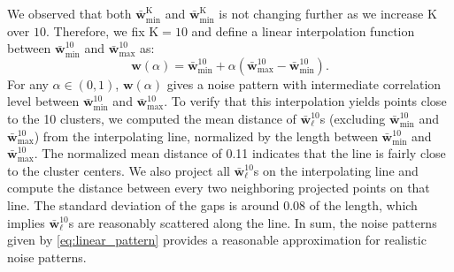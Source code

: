 \documentclass{sig-alternate}
\newcommand{\vect}[1]{\boldsymbol{#1}} %
\begin{document}
We observed that both $\vect{\bar w}^\mathrm{K}_\mathrm{min}$ and $\vect{\bar w}^\mathrm{K}_\mathrm{min}$ is not changing further as we increase $\mathrm{K}$ over $10$. Therefore, we fix $\mathrm{K}=10$ and define a linear interpolation function between $\vect{\bar w}^\mathrm{10}_\mathrm{min}$ and $\vect{\bar w}^\mathrm{10}_\mathrm{max}$ as:
\begin{equation}
\label{eq:linear_pattern}
\mathbf{w}(\alpha) = \vect{\bar w}^\mathrm{10}_\mathrm{min} + \alpha\left(\vect{\bar w}^\mathrm{10}_\mathrm{max}-\vect{\bar w}^\mathrm{10}_\mathrm{min}\right).
\end{equation}
For any $\alpha\in(0,1)$, $\mathbf{w}(\alpha)$ gives a noise pattern with intermediate correlation level between $\vect{\bar w}^\mathrm{10}_\mathrm{min}$ and $\vect{\bar w}^\mathrm{10}_\mathrm{max}$. To verify that this interpolation yields points close to the 10 clusters, we computed the mean distance of $\vect{\bar w}^\mathrm{10}_\ell$s (excluding $\vect{\bar w}^\mathrm{10}_\mathrm{min}$ and $\vect{\bar w}^\mathrm{10}_\mathrm{max}$) from the interpolating line, normalized by the length between $\vect{\bar w}^\mathrm{10}_\mathrm{min}$ and $\vect{\bar w}^\mathrm{10}_\mathrm{max}$. The normalized mean distance of 0.11 indicates that the line is fairly close to the cluster centers. We also project all $\vect{\bar w}^\mathrm{10}_\ell$s on the interpolating line and compute the distance between every two neighboring projected points on that line. The standard deviation of the gaps is around 0.08 of the length, which implies $\vect{\bar w}^\mathrm{10}_\ell$s are reasonably scattered along the line. In sum, the noise patterns given by \eqref{eq:linear_pattern} provides a reasonable approximation for realistic noise patterns.
\end{document}
